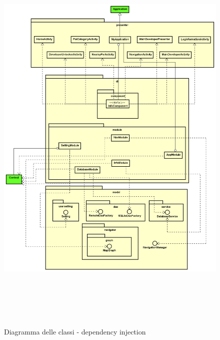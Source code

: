 \documentclass[../DefinizioneDiProdotto.tex]{subfiles}
\begin{document}
\begin{figure}[H]
	\centering
	\includegraphics[height=19cm,width=\textwidth]{diagrams/ModelCompleteNoMethods/PNGpackage/di}
	\label{diPackage}
	\caption{Diagramma delle classi - dependency injection}
\end{figure}
\end{document}
